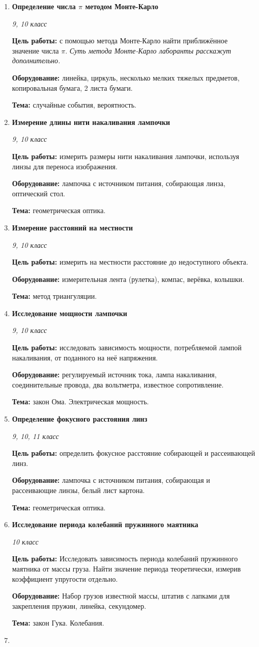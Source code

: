 \documentclass[a4paper,10pt]{article}
\newcommand{\labtitle}[5]{
	\textbf{#2}\par
	\textit{#1 класс}\par
	\textbf{Цель работы:} #3\par
	\textbf{Оборудование:} #4\par
	\textbf{Тема:} #5
}
\begin{document}
\begin{enumerate}
		{9}
		{Определение мощности человека}
		{найти работу, совершаемую при подъеме по лестнице двухэтажного корпуса бегом и шагом. Определить развиваемую при этом мощность.}
		{линейка, секундомер, товарищ.}
		{механические работа и мощность, закон сохранения энергии.}
	\item \labtitle
		{9, 10}
		{Определение числа $\pi$ методом Монте-Карло}
		{с помощью метода Монте-Карло найти приближённое значение числа $\pi$. \textit{Суть метода Монте-Карло лаборанты расскажут дополнительно.}}
		{линейка, циркуль, несколько мелких тяжелых предметов, копировальная бумага, 2 листа бумаги.}
		{случайные события, вероятность.}
	\item \labtitle
		{9, 10}
		{Измерение длины нити накаливания лампочки}
		{измерить размеры нити накаливания лампочки, используя линзы для переноса изображения.}
		{лампочка с источником питания, собирающая линза, оптический стол.}
		{геометрическая оптика.}
	\item \labtitle
		{9, 10}
		{Измерение расстояний на местности}
		{измерить на местности расстояние до недоступного объекта.}
		{измерительная лента (рулетка), компас, верёвка, колышки.}
		{метод триангуляции.}
	\item \labtitle
		{9, 10}
		{Исследование мощности лампочки}
		{исследовать зависимость мощности, потребляемой лампой накаливания, от поданного на неё напряжения.}
		{регулируемый источник тока, лампа накаливания, соединительные провода, два вольтметра, известное сопротивление.}
		{закон Ома. Электрическая мощность.}
	\item \labtitle
		{9, 10, 11}
		{Определение фокусного расстояния линз}
		{определить фокусное расстояние собирающей и рассеивающей линз.}
		{лампочка с источником питания, собирающая и рассеивающие линзы, белый лист картона.}
		{геометрическая оптика.}
	\item \labtitle
		{10}
		{Исследование периода колебаний пружинного маятника}
		{Исследовать зависимость периода колебаний пружинного маятника от массы груза. Найти значение периода теоретически, измерив коэффициент упругости отдельно.}
		{Набор грузов известной массы, штатив с лапками для закрепления пружин, линейка, секундомер.}
		{закон Гука. Колебания.}
	\item \labtitle

\end{enumerate}
\end{document}
